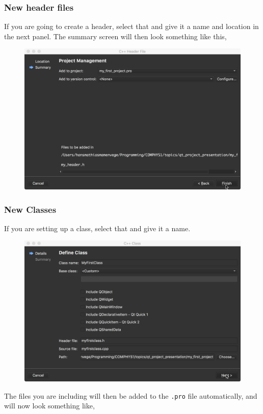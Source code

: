\documentclass[11pt]{article}
\begin{document}
\subsubsection{New header files}
If you are going to create a header, select that and give it a name and location in the next panel. The summary screen will then look something like this,
\begin{figure}[H]
    \centering
    \includegraphics[width=\textwidth]{figures/new_files/first_header.png}
\end{figure}
\subsubsection{New Classes}
If you are setting up a class, select that and give it a name.
\begin{figure}[H]
    \centering
    \includegraphics[width=\textwidth]{figures/new_files/first_class.png}
\end{figure}
The files you are including will then be added to the \texttt{.pro} file automatically, and will now look something like,

\end{document}
